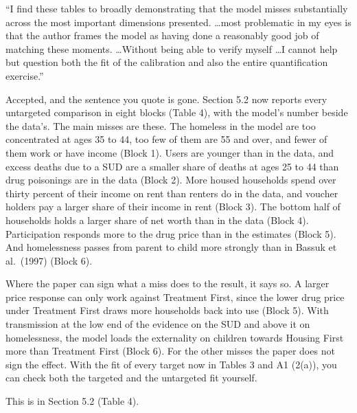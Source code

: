 \documentclass[11pt]{article}
\begin{document}
\begin{referee}
``I find these tables to broadly demonstrating that the model misses substantially
across the most important dimensions presented. \dots most problematic in my eyes
is that the author frames the model as having done a reasonably good job of
matching these moments. \dots Without being able to verify myself \dots I cannot
help but question both the fit of the calibration and also the entire
quantification exercise.''
\end{referee}
\begin{response}
\concede Accepted, and the sentence you quote is gone. Section 5.2 now reports
every untargeted comparison in eight blocks (Table 4), with the model's number
beside the data's. The main misses are these. The homeless in the model are too
concentrated at ages 35 to 44, too few of them are 55 and over, and fewer of them
work or have income (Block 1). Users are younger than in the data, and excess
deaths due to a SUD are a smaller share of deaths at ages 25 to 44 than drug
poisonings are in the data (Block 2). More housed households spend over thirty
percent of their income on rent than renters do in the data, and voucher holders
pay a larger share of their income in rent (Block 3). The bottom half of
households holds a larger share of net worth than in the data (Block 4).
Participation responds more to the drug price than in the estimates (Block 5).
And homelessness passes from parent to child more strongly than in Bassuk et al.\
(1997) (Block 6).

Where the paper can sign what a miss does to the result, it says so. A larger
price response can only work against Treatment First, since the lower drug price
under Treatment First draws more households back into use (Block 5). With
transmission at the low end of the evidence on the SUD and above it on
homelessness, the model loads the externality on children towards Housing First
more than Treatment First (Block 6). For the other misses the paper does not sign
the effect. With the fit of every target now in Tables 3 and A1 (2(a)), you can
check both the targeted and the untargeted fit yourself.

This is in Section 5.2 (Table 4).
\end{response}
\end{document}
